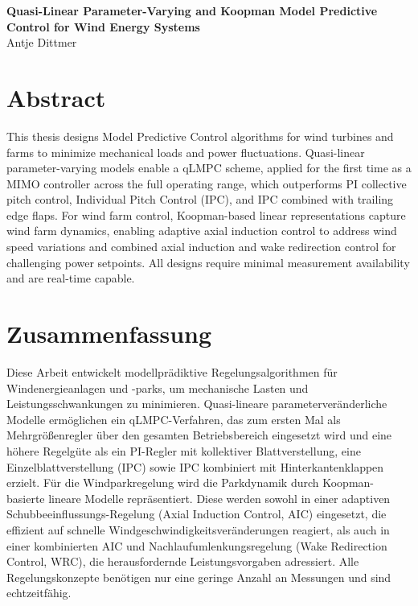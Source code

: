 \documentclass[11pt,a4paper]{article}
\begin{document}
    
    \begin{center}
        {\Large \textbf{Quasi-Linear Parameter-Varying and Koopman Model Predictive Control for Wind Energy Systems}}\\[0.5cm]
        Antje Dittmer
    \end{center}
    
    \section*{Abstract}
    
    This thesis designs Model Predictive Control algorithms for wind turbines and farms to minimize mechanical loads and power fluctuations. Quasi-linear parameter-varying models enable a qLMPC scheme, applied for the first time as a MIMO controller across the full operating range, which outperforms PI collective pitch control, Individual Pitch Control (IPC), and IPC combined with trailing edge flaps. For wind farm control, Koopman-based linear representations capture wind farm dynamics, enabling adaptive axial induction control to address wind speed variations and combined axial induction and wake redirection control for challenging power setpoints. All designs require minimal measurement availability and are real-time capable.
        
    \section*{Zusammenfassung}
    
Diese Arbeit entwickelt modellprädiktive Regelungsalgorithmen für Windenergieanlagen und -parks, um mechanische Lasten und Leistungsschwankungen zu minimieren. Quasi-lineare parameterveränderliche Modelle ermöglichen ein qLMPC-Verfahren, das zum ersten Mal als Mehrgrößenregler über den gesamten Betriebsbereich eingesetzt wird und eine höhere Regelgüte als ein PI-Regler mit kollektiver Blattverstellung, eine Einzelblattverstellung (IPC) sowie IPC kombiniert mit Hinterkantenklappen erzielt. Für die Windparkregelung wird die Parkdynamik durch Koopman-basierte lineare Modelle repräsentiert. Diese werden sowohl in einer adaptiven Schubbeeinflussungs-Regelung (Axial Induction Control, AIC) eingesetzt, die effizient auf schnelle Windgeschwindigkeitsveränderungen reagiert, als auch in einer kombinierten AIC und Nachlaufumlenkungsregelung (Wake Redirection Control, WRC), die herausfordernde Leistungsvorgaben adressiert. Alle Regelungskonzepte benötigen nur eine geringe Anzahl an Messungen und sind echtzeitfähig.
    
\end{document}
